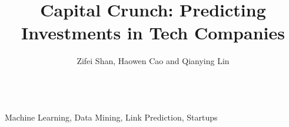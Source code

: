 \documentclass{sig-alternate}
\begin{document}
\title{Capital Crunch: Predicting Investments in Tech Companies}

\author{
\alignauthor
Zifei Shan, Haowen Cao and Qianying Lin\\
        \\
}

\maketitle




\keywords
{Machine Learning, Data Mining, Link Prediction, Startups}






\end{document}
